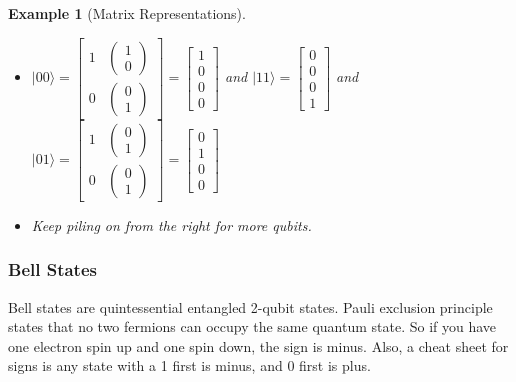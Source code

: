 \documentclass{article}
\newtheorem{example}[theorem]{Example}
\begin{document}
\begin{example}[Matrix Representations]
\begin{itemize}
    \item \(|00\rangle = \begin{bmatrix} 1 & \begin{pmatrix} 1 \\ 0 \end{pmatrix} \\ 0 & \begin{pmatrix} 0 \\ 1 \end{pmatrix} \end{bmatrix} = \begin{bmatrix} 1 \\ 0 \\ 0 \\ 0 \end{bmatrix}\) and \(|11\rangle = \begin{bmatrix} 0 \\ 0 \\ 0 \\ 1 \end{bmatrix}\) and \(|01\rangle = \begin{bmatrix} 1 & \begin{pmatrix} 0 \\ 1 \end{pmatrix} \\ 0 & \begin{pmatrix} 0 \\ 1 \end{pmatrix} \end{bmatrix} = \begin{bmatrix} 0 \\ 1 \\ 0 \\ 0 \end{bmatrix}\)
    \item Keep piling on from the right for more qubits.
\end{itemize}
\end{example}

\subsubsection{Bell States}
\begin{conceptbox}
Bell states are quintessential entangled 2-qubit states. Pauli exclusion principle states that no two fermions can occupy the same quantum state. So if you have one electron spin up and one spin down, the sign is minus. Also, a cheat sheet for signs is any state with a 1 first is minus, and 0 first is plus.
\end{conceptbox}
\end{document}
